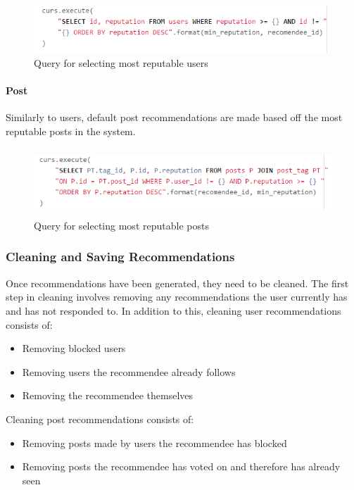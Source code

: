 \begin{figure}[H]
\centering
\includegraphics[height=0.7in]{Images/Implementation/DefaultUsers}
\caption{Query for selecting most reputable users}
\label{fig:DefaultUsers}
\end{figure}

\paragraph{Post}
Similarly to users, default post recommendations are made based off the most reputable posts in the system.

\begin{figure}[H]
\centering
\includegraphics[height=1in]{Images/Implementation/DefaultPosts}
\caption{Query for selecting most reputable posts}
\label{fig:DefaultPosts}
\end{figure}

\subsubsection{Cleaning and Saving Recommendations}
Once recommendations have been generated, they need to be cleaned. The first step in cleaning involves removing any recommendations the user currently has and has not responded to. In addition to this, cleaning user recommendations consists of:
\begin{itemize}
\item Removing blocked users
\item Removing users the recommendee already follows
\item Removing the recommendee themselves
\end{itemize}

\noindent Cleaning post recommendations consists of:
\begin{itemize}
\item Removing posts made by users the recommendee has blocked
\item Removing posts the recommendee has voted on and therefore has already seen
\end{itemize}

